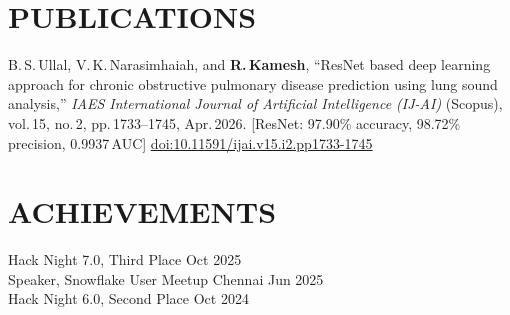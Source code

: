 \documentclass[letterpaper,11pt]{article}
\begin{document}
\section{PUBLICATIONS}

\noindent
B.\,S.\,Ullal, V.\,K.\,Narasimhaiah, and \textbf{R.\,Kamesh},
``ResNet based deep learning approach for chronic obstructive pulmonary disease
prediction using lung sound analysis,''
\textit{IAES International Journal of Artificial Intelligence (IJ-AI)} (Scopus),
vol.\,15, no.\,2, pp.\,1733--1745, Apr.\,2026.
[ResNet: 97.90\% accuracy, 98.72\% precision, 0.9937\,AUC]
\href{https://doi.org/10.11591/ijai.v15.i2.pp1733-1745}{doi:10.11591/ijai.v15.i2.pp1733-1745}

\section{ACHIEVEMENTS}

\noindent
Hack Night 7.0, Third Place \hfill Oct 2025 \\
Speaker, Snowflake User Meetup Chennai \hfill Jun 2025 \\
Hack Night 6.0, Second Place \hfill Oct 2024
\end{document}
